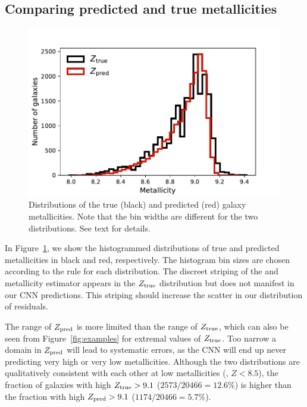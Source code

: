\documentclass[fleqn,usenatbib]{mnras}
\begin{document}
\subsection{Comparing predicted and true metallicities}
\begin{figure}
	\includegraphics[width=\columnwidth]{03-Z_distribution.pdf}
	\caption{\label{fig:distributions}
		Distributions of the true (black) and predicted (red) galaxy metallicities. Note that the bin widths are different for the two distributions. See text for details.}
\end{figure}

In Figure~\ref{fig:distributions}, we show the histogrammed distributions of true and predicted metallicities in black and red, respectively. The histogram bin sizes are chosen according to the \cite{Freedman1981} rule for each distribution. The discreet striping of the \cite{Tremonti2004} and \cite{Brinchmann2004} metallicity estimator appears in the $Z_{\rm true}$ distribution but does not manifest in our CNN predictions. This striping should increase the scatter in our distribution of residuals.

The range of $Z_{\rm pred}$ is more limited than the range of $Z_{\rm true}$, which can also be seen from Figure~\ref{fig:examples} for extremal values of $Z_{\rm true}$. Too narrow a domain in $Z_{\rm pred}$ will lead to systematic errors, as the CNN will end up never predicting very high or very low metallicities. Although the two distributions are qualitatively consistent with each other at low metallicities (\eg, $Z < 8.5$), the fraction of galaxies with high $Z_{\rm true} > 9.1$ ($2573/20466 = 12.6\%$) is higher than the fraction with high $Z_{\rm pred} > 9.1$ ($1174/20466 = 5.7\%$).
\end{document}
